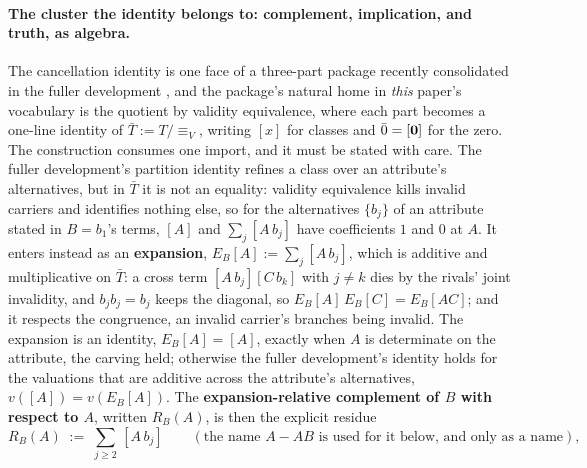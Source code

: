 \paragraph{The cluster the identity belongs to: complement, implication, and truth, as algebra.}\label{par:complement} The cancellation identity is one face of a three-part package recently consolidated in the fuller development \cite{Aethus}, and the package's natural home in \emph{this} paper's vocabulary is the quotient by validity equivalence, where each part becomes a one-line identity of $\bar{T} := T/\!\equiv_V$, writing $[x]$ for classes and $\bar{0} = [\mathbf{0}]$ for the zero. The construction consumes one import, and it must be stated with care. The fuller development's partition identity refines a class over an attribute's alternatives, but in $\bar{T}$ it is not an equality: validity equivalence kills invalid carriers and identifies nothing else, so for the alternatives $\{b_j\}$ of an attribute stated in $B = b_1$'s terms, $[A]$ and $\sum_j [A\, b_j]$ have coefficients $1$ and $0$ at $A$. It enters instead as an \textbf{expansion}, $E_B[A] := \sum_j [A\, b_j]$, which is additive and multiplicative on $\bar{T}$: a cross term $[A\, b_j][C\, b_k]$ with $j \neq k$ dies by the rivals' joint invalidity, and $b_j b_j = b_j$ keeps the diagonal, so $E_B[A]\,E_B[C] = E_B[AC]$; and it respects the congruence, an invalid carrier's branches being invalid. The expansion is an identity, $E_B[A] = [A]$, exactly when $A$ is determinate on the attribute, the carving held; otherwise the fuller development's identity holds for the valuations that are additive across the attribute's alternatives, $v([A]) = v(E_B[A])$. The \textbf{expansion-relative complement of $B$ with respect to $A$}, written $R_B(A)$, is then the explicit residue
\begin{equation}
R_B(A) \;:=\; \sum_{j \geq 2} \,[A\, b_j] \qquad (\text{the name } A - AB \text{ is used for it below, and only as a name}),
\end{equation}
